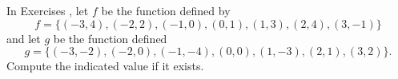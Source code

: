 {\noindent In Exercises}
{, let $f$ be the function defined by \[f = \{(-3, 4), (-2, 2), (-1, 0), (0, 1), (1, 3), (2, 4), (3, -1)\}\] and let $g$ be the function defined \[g = \{(-3, -2), (-2, 0), (-1, -4), (0, 0), (1, -3), (2, 1), (3, 2)\}.\] Compute the indicated value if it exists.
}
\begin{multicols}{2}
\end{multicols}